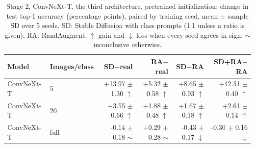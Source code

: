\begin{table}[H]
\centering
\small
\setlength{\tabcolsep}{4pt}
\caption{Stage 2, ConvNeXt-T, the third architecture, pretrained initialization: change in test top-1 accuracy (percentage points), paired by training seed, mean $\pm$ sample SD over 5 seeds. SD: Stable Diffusion with class prompts (1:1 unless a ratio is given); RA: RandAugment. $\uparrow$ gain and $\downarrow$ loss when every seed agrees in sign, $\sim$ inconclusive otherwise.}
\label{tab:stage2-convnext-pretrained-test}
\begin{tabular}{llrrrr}
\toprule
Model & Images/class & SD$-$real & RA$-$real & SD$-$RA & SD+RA$-$RA \\
\midrule
ConvNeXt-T & 5 & +13.97 $\pm$ 1.30 $\uparrow$ & +5.32 $\pm$ 0.58 $\uparrow$ & +8.65 $\pm$ 0.93 $\uparrow$ & +12.51 $\pm$ 0.40 $\uparrow$ \\
ConvNeXt-T & 20 & +3.55 $\pm$ 0.66 $\uparrow$ & +1.88 $\pm$ 0.48 $\uparrow$ & +1.67 $\pm$ 0.18 $\uparrow$ & +2.61 $\pm$ 0.14 $\uparrow$ \\
ConvNeXt-T & full & -0.14 $\pm$ 0.18 $\sim$ & +0.29 $\pm$ 0.28 $\sim$ & -0.43 $\pm$ 0.17 $\downarrow$ & -0.30 $\pm$ 0.16 $\downarrow$ \\
\bottomrule
\end{tabular}
\end{table}
